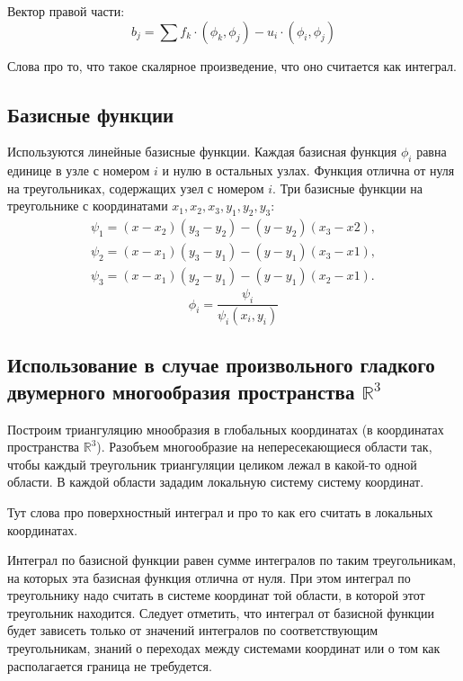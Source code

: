 \documentclass[a4paper]{article}
\begin{document}
Вектор правой части:
\begin{equation*}
b_j= \sum f_k \cdot (\phi_k, \phi_j) - u_i\cdot (\phi_i, \phi_j)
\end{equation*}

Слова про то, что такое скалярное произведение, что оно считается как интеграл.

\subsection*{Базисные  функции}
Используются линейные базисные функции. Каждая базисная функция
$\phi_i$ равна единице в узле с номером $i$ и нулю в остальных
узлах. Функция отлична от нуля на треугольниках, содержащих узел с
номером $i$. 
Три базисные функции на треугольнике с координатами $x_1,x_2,x_3, y_1,y_2,y_3$:
\begin{equation}\label{basis}
\begin{split}
\psi_1=(x-x_2)(y_3-y_2)-(y-y_2)(x_3-x2),\\
\psi_2=(x-x_1)(y_3-y_1)-(y-y_1)(x_3-x1),\\
\psi_3=(x-x_1)(y_2-y_1)-(y-y_1)(x_2-x1).
\end{split}
\end{equation}
\begin{equation*}
\phi_i=\frac{\psi_i}{\psi_i(x_i,y_i)}
\end{equation*}

\subsection*{Использование в случае произвольного гладкого
 двумерного многообразия пространства ${\mathbb R}^{3}$}

Построим триангуляцию мнообразия в глобальных координатах (в
координатах пространства ${\mathbb R}^{3}$). Разобъем многообразие на
непересекающиеся области так, чтобы каждый треугольник триангуляции
целиком лежал в какой-то одной области. В каждой области зададим
локальную систему систему координат. 

Тут слова про поверхностный интеграл и про то как его считать в
локальных координатах.

Интеграл по базисной функции равен сумме интегралов по таким
треугольникам, на которых эта базисная функция отлична от нуля. При
этом интеграл по треугольнику надо считать в системе координат той
области, в которой этот треугольник находится. Следует отметить, что
интеграл от базисной функции будет зависеть только от значений
интегралов по соответствующим треугольникам, знаний о переходах между
системами координат или о том как располагается граница не
требудется. 
\end{document}
